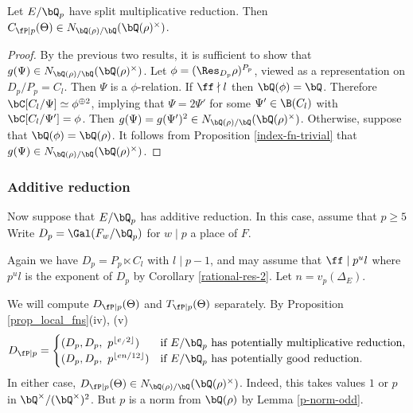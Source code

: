 \begin{cor}
Let $E / \bQ_p$ have split multiplicative reduction. Then $C_{\fP \mid p}(\Theta) \in \fieldnorm{\rho}$.
\end{cor}

\begin{proof}
By the previous two results, it is sufficient to show that $g(\Psi) \in \fieldnorm{\rho}$. Let $\phi = (\Res_{D_p} \rho)^{P_p}$, viewed as a representation on $D_p / P_p = C_l$. Then $\Psi$ is a $\phi$-relation. If $\ff \nmid l$ then $\bQ(\phi) = \bQ$. Therefore $\bC[C_l / \Psi] \simeq \phi^{\oplus 2}$, implying that $\Psi = 2\Psi'$ for some $\Psi' \in \B(C_l)$ with $\bC[C_l / \Psi'] = \phi$. Then $g(\Psi) = g(\Psi')^2 \in \fieldnorm{\rho}$. Otherwise, suppose that $\bQ(\phi) = \bQ(\rho)$. It follows from Proposition \ref{index-fn-trivial} that $g(\Psi) \in \fieldnorm{\rho}$.
\end{proof}

\subsubsection*{Additive reduction}

Now suppose that $E / \bQ_p$ has additive reduction. In this case, assume that $p \geq 5$
Write $D_p = \Gal(F_w / \bQ_p)$ for $w \mid p$ a place of $F$.

Again we have $D_p = P_p \ltimes C_l$ with $ l \mid p - 1$, and may assume that $\ff \mid p^u l$ where $p^u l $ is the exponent of $D_p$ by Corollary \ref{rational-res-2}. Let $n = v_p(\Delta_E)$. 

We will compute $D_{\fP \mid p}(\Theta)$ and $T_{\fP \mid p}(\Theta)$ separately. 
By Proposition \ref{prop_local_fns}(iv), (v)
\[ D_{\fP \mid p} = 
    \begin{cases}
        (D_p, D_p,\ p^{\floor{e_ /2}}) & \text{if } E / \bQ_p \text{ has potentially multiplicative reduction}, \\
        (D_p, D_p,\ p^{\floor{en /12}}) & \text{if } E / \bQ_p \text { has potentially good reduction}.
    \end{cases}
    \]
In either case, $D_{\fP \mid p}(\Theta) \in N_{\bQ(\rho) / \bQ}(\bQ(\rho)^{\times})$. Indeed, this takes values $1$ or $p$ in $\bQ^{\times} / (\bQ^{\times})^2$. But $p$ is a norm from $\bQ(\rho)$ by Lemma \ref{p-norm-odd}.

\vspace{1em}

